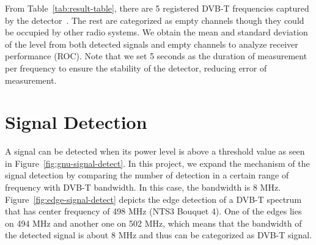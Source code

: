From Table~\ref{tab:result-table}, there are 5 registered DVB-T frequencies captured by the detector~\cite{radiotvnederland}. The rest are categorized as empty channels though they could be occupied by other radio systems. We obtain the mean and standard deviation of the level from both detected signals and empty channels to analyze receiver performance (ROC). Note that we set 5 seconds as the duration of measurement per frequency to ensure the stability of the detector, reducing error of measurement.

\section{Signal Detection}

A signal can be detected when its power level is above a threshold value as seen in Figure~\ref{fig:gnu-signal-detect}. In this project, we expand the mechanism of the signal detection by comparing the number of detection in a certain range of frequency with DVB-T bandwidth. In this case, the bandwidth is 8 MHz. Figure~\ref{fig:edge-signal-detect} depicts the edge detection of a DVB-T spectrum that has center frequency of 498 MHz (NTS3 Bouquet 4). One of the edges lies on 494 MHz and another one on 502 MHz, which means that the bandwidth of the detected signal is about 8 MHz and thus can be categorized as DVB-T signal.

